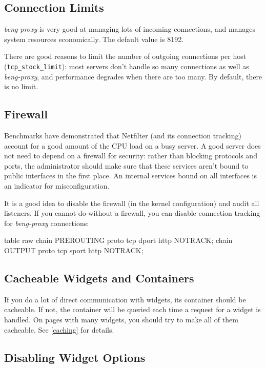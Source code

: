 \documentclass[a4paper,12pt]{article}
\begin{document}
\subsection{Connection Limits}

\emph{beng-proxy} is very good at managing lots of incoming
connections, and manages system resources economically.  The default
value is 8192.

There are good reasons to limit the number of outgoing connections per
host (\verb|tcp_stock_limit|): most servers don't handle so many
connections as well as \emph{beng-proxy}, and performance degrades
when there are too many.  By default, there is no limit.

\subsection{Firewall}

Benchmarks have demonstrated that Netfilter (and its connection
tracking) account for a good amount of the CPU load on a busy server.
A good server does not need to depend on a firewall for security:
rather than blocking protocols and ports, the administrator should
make sure that these services aren't bound to public interfaces in the
first place.  An internal services bound on all interfaces is an
indicator for misconfiguration.

It is a good idea to disable the firewall (in the kernel
configuration) and audit all listeners.  If you cannot do without a
firewall, you can disable connection tracking for \emph{beng-proxy}
connections:

\begin{verbatim*}
table raw {
  chain PREROUTING proto tcp dport http NOTRACK;
  chain OUTPUT proto tcp sport http NOTRACK;
}
\end{verbatim*}

\subsection{Cacheable Widgets and Containers}

If you do a lot of direct communication with widgets, its container
should be cacheable.  If not, the container will be queried each time
a request for a widget is handled.  On pages with many widgets, you
should try to make all of them cacheable.  See \ref{caching} for
details.

\subsection{Disabling Widget Options}
\end{document}
